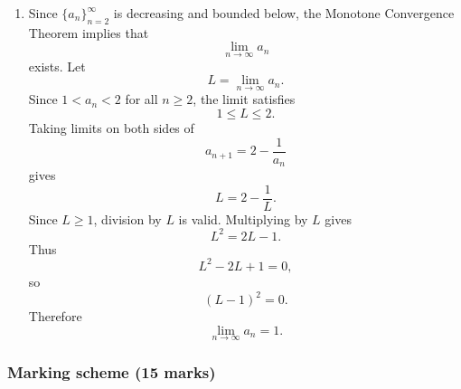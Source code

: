 \documentclass[12pt]{article}
\begin{document}
\begin{enumerate}[label=(\roman*)]
It remains to prove that the sequence is decreasing. From part (ii),
\[
a_3-a_2<0.
\]
Assume that for some $k\ge 2$,
\[
a_{k+1}-a_k<0.
\]
Then
\begin{align*}
a_{k+2}-a_{k+1}
&=
\left(2-\frac1{a_{k+1}}\right)-\left(2-\frac1{a_k}\right)\\
&=
\frac1{a_k}-\frac1{a_{k+1}}\\
&=
\frac{a_{k+1}-a_k}{a_ka_{k+1}}.
\end{align*}
From the bound already proved, $a_k>1$ and $a_{k+1}>1$, so
\[
a_ka_{k+1}>0.
\]
Since $a_{k+1}-a_k<0$, it follows that
\[
a_{k+2}-a_{k+1}<0.
\]
By induction,
\[
a_{n+1}<a_n
\qquad\text{for all }n\ge 2.
\]
Hence
\[
\boxed{\{a_n\}_{n=2}^{\infty}\text{ is bounded and decreasing}.}
\]

\item Since $\{a_n\}_{n=2}^{\infty}$ is decreasing and bounded below, the Monotone Convergence Theorem implies that
\[
\lim_{n\to\infty}a_n
\]
exists. Let
\[
L=\lim_{n\to\infty}a_n.
\]
Since $1<a_n<2$ for all $n\ge2$, the limit satisfies
\[
1\le L\le 2.
\]
Taking limits on both sides of
\[
a_{n+1}=2-\frac1{a_n}
\]
gives
\[
L=2-\frac1L.
\]
Since $L\ge 1$, division by $L$ is valid. Multiplying by $L$ gives
\[
L^2=2L-1.
\]
Thus
\[
L^2-2L+1=0,
\]
so
\[
(L-1)^2=0.
\]
Therefore
\[
\boxed{\lim_{n\to\infty}a_n=1.}
\]
\end{enumerate}

\subsubsection{Marking scheme (15 marks)}
\end{document}

